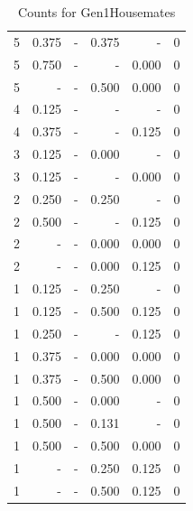 \documentclass[a4paper]{article}\usepackage{graphicx, color}
\begin{document}
\begin{table}[ht]
\begin{tabular}{rrrrrr}
   \rowcolor{sosoColor} 5 & 0.375 & - & 0.375 & - & 0 \\ 
   \rowcolor{nullColor} 5 & 0.750 & - & - & 0.000 & 0 \\ 
   \rowcolor{sosoColor} 5 & - & - & 0.500 & 0.000 & 0 \\ 
   \rowcolor{nullColor} 4 & 0.125 & - & - & - & 0 \\ 
   \rowcolor{nullColor} 4 & 0.375 & - & - & 0.125 & 0 \\ 
   \rowcolor{sosoColor} 3 & 0.125 & - & 0.000 & - & 0 \\ 
   \rowcolor{nullColor} 3 & 0.125 & - & - & 0.000 & 0 \\ 
   \rowcolor{sosoColor} 2 & 0.250 & - & 0.250 & - & 0 \\ 
   \rowcolor{nullColor} 2 & 0.500 & - & - & 0.125 & 0 \\ 
   \rowcolor{sosoColor} 2 & - & - & 0.000 & 0.000 & 0 \\ 
   \rowcolor{sosoColor} 2 & - & - & 0.000 & 0.125 & 0 \\ 
   \rowcolor{sosoColor} 1 & 0.125 & - & 0.250 & - & 0 \\ 
   \rowcolor{sosoColor} 1 & 0.125 & - & 0.500 & 0.125 & 0 \\ 
   \rowcolor{nullColor} 1 & 0.250 & - & - & 0.125 & 0 \\ 
   \rowcolor{sosoColor} 1 & 0.375 & - & 0.000 & 0.000 & 0 \\ 
   \rowcolor{sosoColor} 1 & 0.375 & - & 0.500 & 0.000 & 0 \\ 
   \rowcolor{sosoColor} 1 & 0.500 & - & 0.000 & - & 0 \\ 
   \rowcolor{sosoColor} 1 & 0.500 & - & 0.131 & - & 0 \\ 
   \rowcolor{sosoColor} 1 & 0.500 & - & 0.500 & 0.000 & 0 \\ 
   \rowcolor{sosoColor} 1 & - & - & 0.250 & 0.125 & 0 \\ 
   \rowcolor{sosoColor} 1 & - & - & 0.500 & 0.125 & 0 \\ 
   \hline
\end{tabular}
\caption{Counts for Gen1Housemates} 
\end{table}
\end{document}
